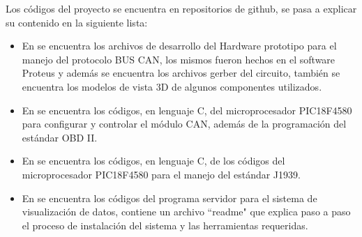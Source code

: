  




Los códigos del proyecto se encuentra en repositorios de github, se pasa a explicar su contenido en la siguiente lista: 
\begin{itemize}
    \item En \cite{githw} se encuentra los archivos de desarrollo del Hardware prototipo para el manejo del protocolo BUS CAN, los mismos fueron hechos en el software Proteus y además se encuentra los archivos gerber del circuito, también se encuentra los modelos de vista 3D de algunos componentes utilizados.  
    
    \item En \cite{gitfirm} se encuentra los códigos, en lenguaje C, del microprocesador PIC18F4580 para configurar y controlar el módulo CAN, además de la programación del estándar OBD II.
    
    \item En \cite{gitj} se encuentra los códigos, en lenguaje C, de los códigos del microprocesador PIC18F4580 para el manejo del estándar J1939.
   
   
    \item En \cite{gitnode} se encuentra los códigos del programa servidor para el sistema de visualización de datos, contiene un archivo ``readme" que explica paso a paso el proceso de instalación del sistema y las herramientas requeridas.  
  
\end{itemize}



















